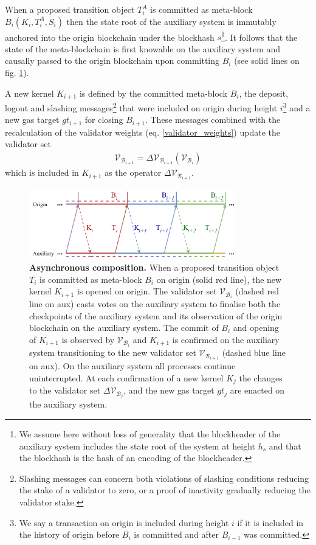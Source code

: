 \documentclass[12pt,a4paper]{article}
\begin{document}
When a proposed transition object $T^A_i$ is committed as meta-block $B_i(K_i, T^A_i, S_i)$ then the state root of the auxiliary system is immutably anchored into the origin blockchain under the blockhash $s$\footnote{
  We assume here without loss of generality that the blockheader of the auxiliary system includes the state root of the system at height $h_s$ and that the blockhash is the hash of an encoding of the blockheader.}.
It follows that the state of the meta-blockchain is first knowable on the auxiliary system and causally passed to the origin blockchain upon committing $B_i$ (see solid lines on fig. \ref{fig:asynccomp}).

A new kernel $K_{i+1}$ is defined by the committed meta-block $B_i$, the deposit, logout and slashing messages\footnote{
  Slashing messages can concern both violations of slashing conditions reducing the stake of a validator to zero, or a proof of inactivity gradually reducing the validator stake.}
that were included on origin during height $i$\footnote{
  We say a transaction on origin is included during height $i$ if it is included in the history of origin before $B_{i}$ is committed and after $B_{i-1}$ was committed.}
and a new gas target $gt_{i+1}$ for closing $B_{i+1}$.
These messages combined with the recalculation of the validator weights (eq. \ref{validator_weights}) update the validator set
\begin{align}
  \mathcal{V}_{\mathcal{B}_{i+1}} = \Delta\mathcal{V}_{\mathcal{B}_{i+1}}(\mathcal{V}_{\mathcal{B}_{i}})
\end{align}
which is included in $K_{i+1}$ as the operator $\Delta\mathcal{V}_{\mathcal{B}_{i+1}}$. 

\begin{figure}[tb]
    \centering
	\includegraphics[width=0.8\textwidth]{transition}
	\caption{\textbf{Asynchronous composition.}
		When a proposed transition object $T_i$ is committed as meta-block $B_i$ on origin (solid red line), the new kernel $K_{i+1}$ is opened on origin.
		The validator set $\mathcal{V}_{\mathcal{B}_i}$ (dashed red line on aux) casts votes on the auxiliary system to finalise both the checkpoints of the auxiliary system and its observation of the origin blockchain on the auxiliary system.
		The commit of $B_i$ and opening of $K_{i+1}$ is observed by $\mathcal{V}_{\mathcal{B}_i}$ and $K_{i+1}$ is confirmed on the auxiliary system transitioning to the new validator set $\mathcal{V}_{\mathcal{B}_{i+1}}$ (dashed blue line on aux).
		On the auxiliary system all processes continue uninterrupted.
		At each confirmation of a new kernel $K_j$ the changes to the validator set $\Delta\mathcal{V}_{\mathcal{B}_j}$, and the new gas target $gt_j$ are enacted on the auxiliary system.
	}
	\label{fig:asynccomp}
\end{figure}
\end{document}
